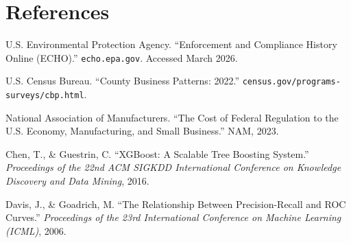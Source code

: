 \documentclass{article}
\begin{document}
\section*{References}
\begin{enumerate}[label={[\arabic*]}]
    \item U.S. Environmental Protection Agency. ``Enforcement and Compliance History Online (ECHO).'' \texttt{echo.epa.gov}. Accessed March 2026.
    \item U.S. Census Bureau. ``County Business Patterns: 2022.'' \texttt{census.gov/programs-surveys/cbp.html}.
    \item National Association of Manufacturers. ``The Cost of Federal Regulation to the U.S. Economy, Manufacturing, and Small Business.'' NAM, 2023.
    \item Chen, T., \& Guestrin, C. ``XGBoost: A Scalable Tree Boosting System.'' \textit{Proceedings of the 22nd ACM SIGKDD International Conference on Knowledge Discovery and Data Mining}, 2016.
    \item Davis, J., \& Goadrich, M. ``The Relationship Between Precision-Recall and ROC Curves.'' \textit{Proceedings of the 23rd International Conference on Machine Learning (ICML)}, 2006.
\end{enumerate}
\end{document}
